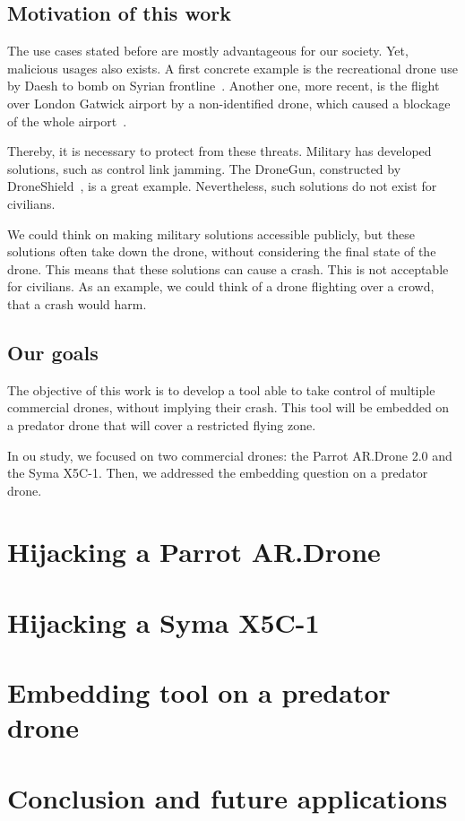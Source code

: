 \documentclass[conference,a4paper]{IEEEtran}
\begin{document}
\subsection{Motivation of this work}
The use cases stated before are mostly advantageous for our society. Yet, malicious usages
also exists. A first concrete example is the recreational drone use by Daesh to bomb on Syrian
frontline~\cite{bib:daesh}. Another one, more recent, is the flight over London Gatwick
airport by a non-identified drone, which caused a blockage of the whole
airport~\cite{bib:gatwick}.

Thereby, it is necessary to protect from these threats. Military has developed solutions,
such as control link jamming. The DroneGun, constructed by
DroneShield~\cite{bib:droneshield}, is a great example. Nevertheless, such solutions
do not exist for civilians.

We could think on making military solutions accessible publicly, but these solutions often
take down the drone, without considering the final state of the drone. This means that
these solutions can cause a crash. This is not acceptable for civilians. As an example, we
could think of a drone flighting over a crowd, that a crash would harm.

\subsection{Our goals}
The objective of this work is to develop a tool able to take control of multiple
commercial drones, without implying their crash. This tool will be embedded on a predator
drone that will cover a restricted flying zone.

In ou study, we focused on two commercial drones: the Parrot AR.Drone 2.0 and the Syma
X5C-1. Then, we addressed the embedding question on a predator drone.

\section{Hijacking a Parrot AR.Drone}
\section{Hijacking a Syma X5C-1}
\section{Embedding tool on a predator drone}
\section{Conclusion and future applications}
\end{document}
